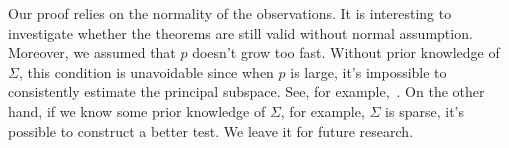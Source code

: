 \documentclass[12pt]{article} %
\theoremstyle{definition}
\begin{document}
Our proof relies on the normality of the observations.
It is interesting to investigate whether the theorems are still valid without normal assumption.
Moreover, we assumed that $p$ doesn't grow too fast.
 Without prior knowledge of $\Sigma$, this condition is unavoidable since when $p$ is large, it's impossible to consistently estimate the principal subspace.
See, for example,~\cite{Cai2012Sparse}.
On the other hand, if we know some prior knowledge of $\Sigma$, for example, $\Sigma$ is sparse, it's possible to construct a better test.
We leave it for future research.


\end{document}
